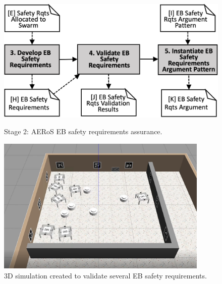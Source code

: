 \documentclass[runningheads]{llncs}
\begin{document}
\begin{figure}[!t]
	\centering
	\begin{minipage}{.55\textwidth}
		\centering
		\includegraphics[trim={0mm -6mm 0mm -6mm},clip,width=\textwidth]{figures/amlas-a-stage2-v3.png}
		\vspace{-2ex}
		\caption{Stage 2: AERoS EB safety requirements assurance.}%
	\label{amlas-a-stage2}
\end{minipage}%
\begin{minipage}{.45\textwidth}
	\centering
	\includegraphics[trim={30mm 25mm 45mm 30mm},clip,width=0.9\textwidth]{figures/3Dsim.png}
	\vspace{-2ex}
	\caption{3D simulation created to validate several EB safety requirements.}
	\label{3Dsim}
\end{minipage}
\vspace{-4ex}
\end{figure}
\end{document}
